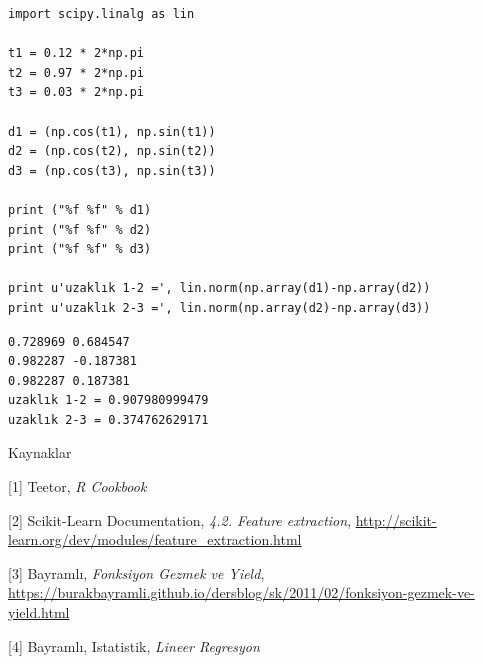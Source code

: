 \documentclass[12pt,fleqn]{article}\usepackage{../../common}
\begin{document}
\begin{verbatim}
import scipy.linalg as lin

t1 = 0.12 * 2*np.pi
t2 = 0.97 * 2*np.pi
t3 = 0.03 * 2*np.pi

d1 = (np.cos(t1), np.sin(t1))
d2 = (np.cos(t2), np.sin(t2))
d3 = (np.cos(t3), np.sin(t3))

print ("%f %f" % d1)
print ("%f %f" % d2)
print ("%f %f" % d3)

print u'uzaklık 1-2 =', lin.norm(np.array(d1)-np.array(d2))
print u'uzaklık 2-3 =', lin.norm(np.array(d2)-np.array(d3))
\end{verbatim}

\begin{verbatim}
0.728969 0.684547
0.982287 -0.187381
0.982287 0.187381
uzaklık 1-2 = 0.907980999479
uzaklık 2-3 = 0.374762629171
\end{verbatim}

Kaynaklar 

[1] Teetor, {\em R Cookbook}

[2] Scikit-Learn Documentation, {\em 4.2. Feature extraction}, \url{http://scikit-learn.org/dev/modules/feature_extraction.html}

[3] Bayramlı, 
    {\em Fonksiyon Gezmek ve Yield}, 
    \url{https://burakbayramli.github.io/dersblog/sk/2011/02/fonksiyon-gezmek-ve-yield.html}

[4] Bayramlı, Istatistik, {\em Lineer Regresyon}
\end{document}
